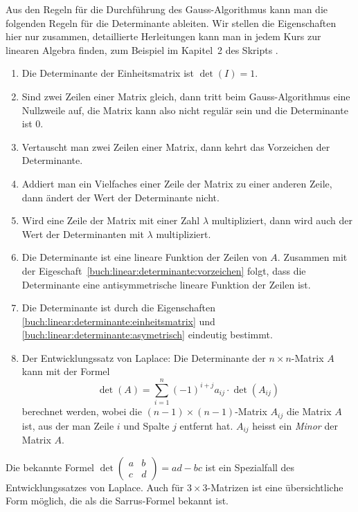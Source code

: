 Aus den Regeln für die Durchführung des Gauss-Algorithmus kann man die
folgenden Regeln für die Determinante ableiten.
Wir stellen die Eigenschaften hier nur zusammen, detaillierte Herleitungen
kann man in jedem Kurs zur linearen Algebra finden, zum Beispiel im
Kapitel~2 des Skripts \cite{buch:linalg}.
\begin{enumerate}
\item
\label{buch:linear:determinante:einheitsmatrix}
Die Determinante der Einheitsmatrix ist $\det(I)=1$.
\item
Sind zwei Zeilen einer Matrix gleich, dann tritt beim Gauss-Algorithmus
eine Nullzweile auf, die Matrix kann also nicht regulär sein und die
Determinante ist $0$.
\item
\label{buch:linear:determinante:vorzeichen}
Vertauscht man zwei Zeilen einer Matrix, dann kehrt das Vorzeichen der
Determinante.
\item
Addiert man ein Vielfaches einer Zeile der Matrix zu einer anderen Zeile,
dann ändert der Wert der Determinante nicht.
\item
Wird eine Zeile der Matrix mit einer Zahl $\lambda$ multipliziert, dann
wird auch der Wert der Determinanten mit $\lambda$ multipliziert.
\item
\label{buch:linear:determinante:asymetrisch}
Die Determinante ist eine lineare Funktion der Zeilen von $A$.
Zusammen mit der Eigeschaft~\ref{buch:linear:determinante:vorzeichen}
folgt, dass die Determinante eine antisymmetrische lineare Funktion
der Zeilen ist.
\item
Die Determinante ist durch die Eigenschaften
\ref{buch:linear:determinante:einheitsmatrix}
und
\ref{buch:linear:determinante:asymetrisch}
eindeutig bestimmt.
\item
Der Entwicklungssatz von Laplace:
%
Die Determinante der $n\times n$-Matrix $A$ kann mit der Formel
\begin{equation}
\det(A)
=
\sum_{i=1}^n (-1)^{i+j} a_{i\!j} \cdot \det(A_{i\!j})
\end{equation}
berechnet werden,
wobei die $(n-1)\times(n-1)$-Matrix $A_{i\!j}$ die Matrix $A$ ist, aus der
man Zeile $i$ und Spalte $j$ entfernt hat.
$A_{i\!j}$ heisst ein {\em Minor} der Matrix $A$.
%
\end{enumerate}

Die bekannte Formel $\det\begin{pmatrix}a&b\\c&d\end{pmatrix}=ad-bc$
ist ein Spezialfall des Entwicklungssatzes von Laplace.
Auch für $3\times 3$-Matrizen ist eine übersichtliche Form möglich,
die als die Sarrus-Formel bekannt ist.
%

